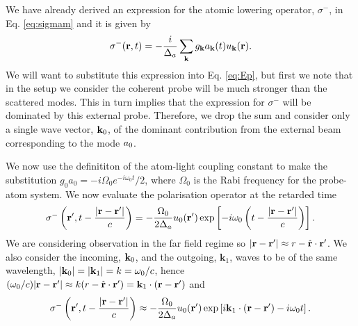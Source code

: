 We have already derived an expression for the atomic lowering
operator, $\sigma^-$, in Eq. \eqref{eq:sigmam} and it is given by
\begin{equation}
  \sigma^-(\mathbf{r}, t) = - \frac{i} {\Delta_a} \sum_{\mathbf{k}} g_{\mathbf{k}}
  a_{\mathbf{k}}(t) u_{\mathbf{k}}(\mathbf{r}).
\end{equation}
We will want to substitute this expression into Eq. \eqref{eq:Ep}, but
first we note that in the setup we consider the coherent probe will be
much stronger than the scattered modes. This in turn implies that the
expression for $\sigma^-$ will be dominated by this external
probe. Therefore, we drop the sum and consider only a single wave
vector, $\mathbf{k}_0$, of the dominant contribution from the external
beam corresponding to the mode $a_0$.

We now use the definititon of the atom-light coupling constant
\cite{Scully} to make the substitution
$g_0 a_0 = -i \Omega_0 e^{-i \omega_0 t} / 2$, where
$\Omega_0$ is the Rabi frequency for the probe-atom system. We now
evaluate the polarisation operator at the retarded time
\begin{equation}
  \sigma^- \left(\mathbf{r}^\prime, t - \frac{|\mathbf{r} - \mathbf{r}^\prime|}{c} \right) =
  -\frac{\Omega_0}{2 \Delta_a} u_0 (\mathbf{r}^\prime) \exp \left[-i \omega_0
    \left( t - \frac{|\mathbf{r} - \mathbf{r}^\prime|}{c} \right)\right].
\end{equation}
We are considering observation in the far field regime so
$|\mathbf{r} - \mathbf{r}^\prime| \approx r - \hat{\mathbf{r}} \cdot
\mathbf{r}^\prime$. We also consider the incoming, $\mathbf{k}_0$, and the
outgoing, $\mathbf{k}_1$, waves to be of the same wavelength,
$|\mathbf{k}_0| = |\mathbf{k}_1| = k = \omega_0 / c$, hence
$(\omega_0 / c) |\mathbf{r} - \mathbf{r}^\prime| \approx k (r - \hat{\mathbf{r}}
\cdot \mathbf{r}^\prime) = \mathbf{k}_1 \cdot (\mathbf{r} - \mathbf{r}^\prime )$ and
\begin{equation}
  \sigma^- \left(\mathbf{r}^\prime, t - \frac{|\mathbf{r} - \mathbf{r}^\prime|}{c} \right) \approx
  -\frac{\Omega_0}{2 \Delta_a} u_0 (\mathbf{r}^\prime) \exp \left[i
    \mathbf{k}_1 \cdot (\mathbf{r} - \mathbf{r}^\prime ) - i \omega_0 t \right].
\end{equation}

